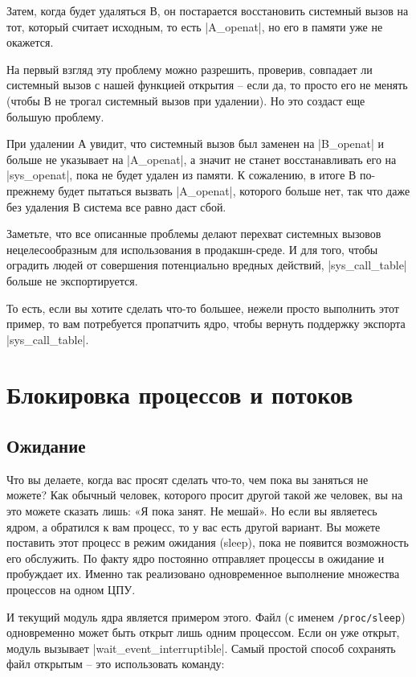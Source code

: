 \documentclass[10pt, oneside]{book}
\begin{document}
Затем, когда будет удаляться В, он постарается восстановить системный вызов на тот, который считает исходным, то есть \cpp|A_openat|, но его в памяти уже не окажется.

На первый взгляд эту проблему можно разрешить, проверив, совпадает ли системный вызов с нашей функцией открытия – если да, то просто его не менять (чтобы В не трогал системный вызов при удалении). Но это создаст еще большую проблему.

При удалении А увидит, что системный вызов был заменен на \cpp|B_openat| и больше не указывает на \cpp|A_openat|, а значит не станет восстанавливать его на \cpp|sys_openat|, пока не будет удален из памяти.
К сожалению, в итоге В по-прежнему будет пытаться вызвать \cpp|A_openat|, которого больше нет, так что даже без удаления В система все равно даст сбой.

Заметьте, что все описанные проблемы делают перехват системных вызовов нецелесообразным для использования в продакшн-среде. И для того, чтобы оградить
людей от совершения потенциально вредных действий, \cpp|sys_call_table| больше не экспортируется.

То есть, если вы хотите сделать что-то большее, нежели просто выполнить этот пример, то вам потребуется пропатчить ядро, чтобы вернуть поддержку экспорта \cpp|sys_call_table|.


\section{Блокировка процессов и потоков}
\label{sec:blocking_process_thread}
\subsection{Ожидание}
\label{sec:sleep}
Что вы делаете, когда вас просят сделать что-то, чем пока вы заняться не можете? Как обычный человек, которого просит другой такой же человек, вы на это можете сказать лишь: «Я пока занят. Не мешай». Но если вы являетесь ядром, а обратился к вам процесс, то у вас есть другой вариант.
Вы можете поставить этот процесс в режим ожидания (sleep), пока не появится возможность его обслужить. По факту ядро постоянно отправляет процессы в ожидание и пробуждает их. Именно так реализовано одновременное выполнение множества процессов на одном ЦПУ.

И текущий модуль ядра является примером этого. Файл (с именем \verb|/proc/sleep|) одновременно может быть открыт лишь одним процессом. Если он уже открыт, модуль вызывает \cpp|wait_event_interruptible|.
Самый простой способ сохранять файл открытым – это использовать команду:
\end{document}
